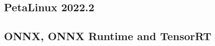 \subsection{PetaLinux 2022.2}
\label{sec:petalinux}

\subsection{ONNX, ONNX Runtime and TensorRT}
\label{sec:runtimes}
